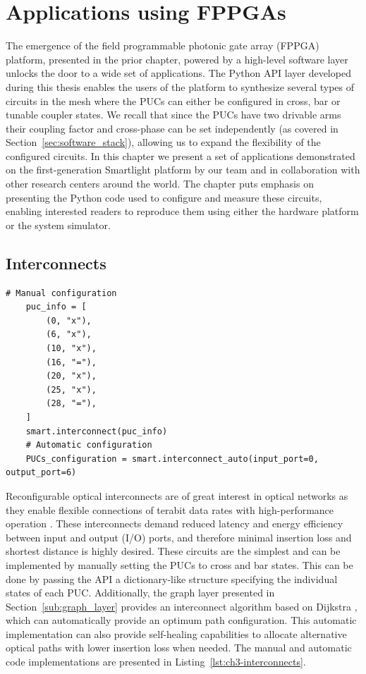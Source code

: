 
\chapter{Applications using FPPGAs}\label{chap:applications_using_fppgas} %

The emergence of the field programmable photonic gate array (FPPGA) platform, presented in the prior chapter, powered by a high-level software layer unlocks the door to a wide set of applications.
The Python API layer developed during this thesis enables the users of the platform to synthesize several types of circuits in the mesh where the PUCs can either be configured in cross, bar or tunable coupler states.
We recall that since the PUCs have two drivable arms their coupling factor and cross-phase can be set independently (as covered in Section~\ref{sec:software_stack}), allowing us to expand the flexibility of the configured circuits.
In this chapter we present a set of applications demonstrated on the first-generation Smartlight platform by our team and in collaboration with other research centers around the world.
The chapter puts emphasis on presenting the Python code used to configure and measure these circuits, enabling interested readers to reproduce them using either the hardware platform or the system simulator.

\section{Interconnects}\label{sec:interconnects} %

\begin{lstlisting}[caption={Implementation of manual and automatic interconnects using the first-generation Smartlight API}, label=lst:ch3-interconnects]
	# Manual configuration
	puc_info = [
		(0, "x"),
		(6, "x"),
		(10, "x"),
		(16, "="),
		(20, "x"),
		(25, "x"),
		(28, "="),
	]
	smart.interconnect(puc_info)
	# Automatic configuration
	PUCs_configuration = smart.interconnect_auto(input_port=0, output_port=6)
	\end{lstlisting}

Reconfigurable optical interconnects are of great interest in optical networks as they enable flexible connections of terabit data rates with high-performance operation \cite{khani_sip-ml_2021}.
These interconnects demand reduced latency and energy efficiency between input and output (I/O) ports, and therefore minimal insertion loss and shortest distance is highly desired.
These circuits are the simplest and can be implemented by manually setting the PUCs to cross and bar states.
This can be done by passing the API a dictionary-like structure specifying the individual states of each PUC.
Additionally, the graph layer presented in Section~\ref{sub:graph_layer} provides an interconnect algorithm based on Dijkstra \cite{foead_systematic_2021,bierlaire_optimization_2015}, which can automatically provide an optimum path configuration.
This automatic implementation can also provide self-healing capabilities to allocate alternative optical paths with lower insertion loss when needed.
The manual and automatic code implementations are presented in Listing~\ref{lst:ch3-interconnects}.

